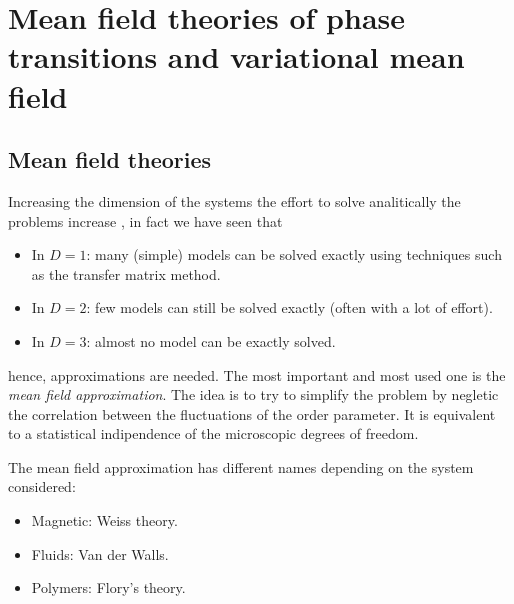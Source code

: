 \documentclass[../main/main.tex]{subfiles}
\begin{document}
\chapter{Mean field theories of phase transitions and variational mean field}

\section{Mean field theories}

Increasing the dimension of the systems the effort to solve analitically the problems increase , in fact we have seen that
\begin{itemize}
\item In \( D=1 \): many (simple) models can be solved exactly using techniques such as the transfer matrix method.
\item In \( D=2 \): few models can still be solved exactly (often with a lot of effort).
\item In \( D=3 \): almost no model can be exactly solved.
\end{itemize}
hence, approximations are needed.
The most important and most used one is the \emph{mean field approximation}. The idea is to try to simplify the problem by negletic the correlation between the fluctuations of the order parameter. It is equivalent to a statistical indipendence of the microscopic degrees of freedom.

The mean field approximation has different names depending on the system considered:
\begin{itemize}
\item Magnetic: Weiss theory.
\item Fluids: Van der Walls.
\item Polymers: Flory's theory.
\end{itemize}
\end{document}
